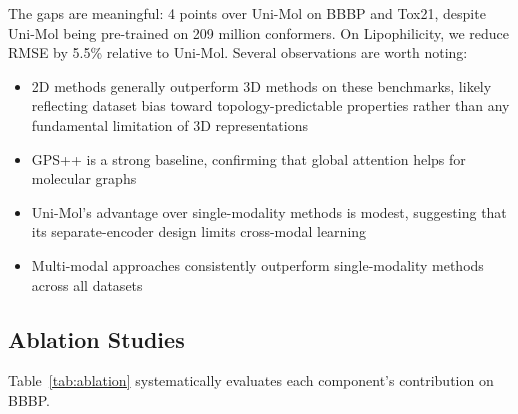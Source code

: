 \documentclass[11pt]{article}
\begin{document}
The gaps are meaningful: 4 points over Uni-Mol on BBBP and Tox21, despite Uni-Mol being pre-trained on 209 million conformers. On Lipophilicity, we reduce RMSE by 5.5\% relative to Uni-Mol. Several observations are worth noting:
\begin{itemize}[leftmargin=*,itemsep=2pt]
    \item 2D methods generally outperform 3D methods on these benchmarks, likely reflecting dataset bias toward topology-predictable properties rather than any fundamental limitation of 3D representations
    \item GPS++ is a strong baseline, confirming that global attention helps for molecular graphs
    \item Uni-Mol's advantage over single-modality methods is modest, suggesting that its separate-encoder design limits cross-modal learning
    \item Multi-modal approaches consistently outperform single-modality methods across all datasets
\end{itemize}

\subsection{Ablation Studies}
\label{sec:ablation}

Table~\ref{tab:ablation} systematically evaluates each component's contribution on BBBP.
\end{document}
